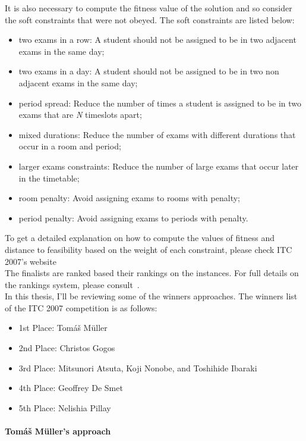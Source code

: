 It is also necessary to compute the fitness value of the solution and so consider the soft constraints that were not obeyed. The soft constraints are listed below:
\begin{itemize}
	\item two exams in a row: A student should not be assigned to be in two adjacent exams in the same day;
	\item two exams in a day: A student should not be assigned to be in two non adjacent exams in the same day;
	\item period spread: Reduce the number of times a student is assigned to be in two exams that are \textit{N} timeslots apart;
	\item mixed durations: Reduce the number of exams with different durations that occur in a room and period;
	\item larger exams constraints: Reduce the number of large exams that occur later in the timetable;
	\item room penalty: Avoid assigning exams to rooms with penalty;
	\item period penalty: Avoid assigning exams to periods with penalty.
\end{itemize}

To get a detailed explanation on how to compute the values of fitness and distance to feasibility based on the weight of each constraint, please check ITC 2007's website~\cite{McCollum2008}\\

The finalists are ranked based their rankings on the instances. For full details on the rankings system, please consult~\cite{BarryMcCollum2008}.\\

In this thesis, I'll be reviewing some of the winners approaches. The winners list of the ITC 2007 competition is as follows:
\begin{itemize}
	\item 1st Place: Tom\'{a}\v{s} M\"{u}ller
	\item 2nd Place: Christos Gogos
	\item 3rd Place: Mitsunori Atsuta, Koji Nonobe, and Toshihide Ibaraki
	\item 4th Place: Geoffrey De Smet
	\item 5th Place: Nelishia Pillay
\end{itemize}

\paragraph{Tom\'{a}\v{s} M\"{u}ller's approach}

